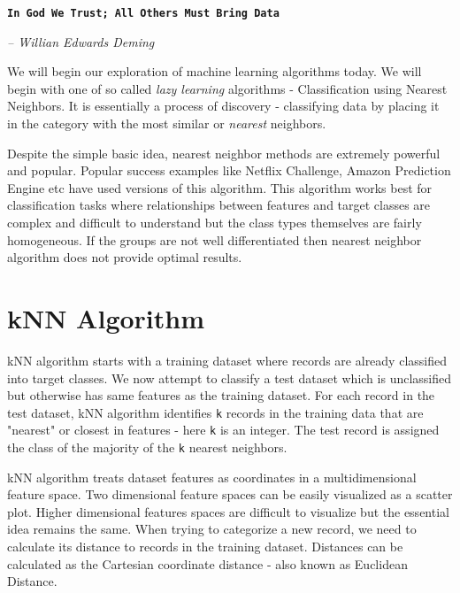 \documentclass[11pt, letterpaper, twoside]{memoir}\usepackage{knitr}
\begin{document}
\begin{flushright}

\textbf{\texttt{In God We Trust; All Others Must Bring Data}}

\emph{-- Willian Edwards Deming}

\end{flushright}

\vspace{12pt}


We will begin our exploration of machine learning algorithms today. We will begin with one of so called \emph{lazy learning} algorithms - Classification using Nearest Neighbors. It is essentially a process of discovery - classifying data by placing it in the category with the most similar or \emph{nearest} neighbors.

Despite the simple basic idea, nearest neighbor methods are extremely powerful and popular. Popular success examples like Netflix Challenge, Amazon Prediction Engine etc have used versions of this algorithm. This algorithm works best for classification tasks where relationships between features and target classes are complex and difficult to understand but the class types themselves are fairly homogeneous. If the groups are not well differentiated then nearest neighbor algorithm does not provide optimal results.

\section{kNN Algorithm}

kNN algorithm starts with a training dataset where records are already classified into target classes. We now attempt to classify a test dataset which is unclassified but otherwise has same features as the training dataset. For each record in the test dataset, kNN algorithm identifies \verb|k| records in the training data that are "nearest" or closest in features - here \verb|k| is an integer. The test record is assigned the class of the majority of the \verb|k| nearest neighbors.

kNN algorithm treats dataset features as coordinates in a multidimensional feature space. Two dimensional feature spaces can be easily visualized as a scatter plot. Higher dimensional features spaces are difficult to visualize but the essential idea remains the same. When trying to categorize a new record, we need to calculate its distance to records in the training dataset. Distances can be calculated as the Cartesian coordinate distance - also known as Euclidean Distance.
\end{document}
